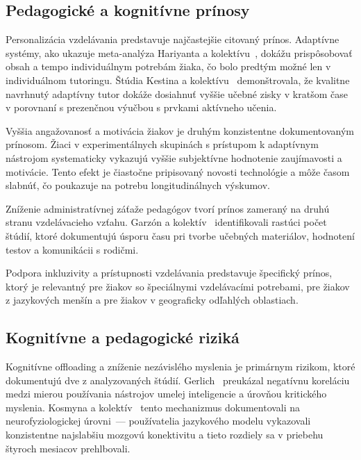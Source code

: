 \subsection{Pedagogické a kognitívne prínosy}

Personalizácia vzdelávania predstavuje najčastejšie citovaný prínos. Adaptívne systémy, ako ukazuje meta-analýza Hariyanta a kolektívu~\cite{hariyanto2025adaptive}, dokážu prispôsobovať obsah a tempo individuálnym potrebám žiaka, čo bolo predtým možné len v individuálnom tutoringu. Štúdia Kestina a kolektívu~\cite{kestin2025aitutoring} demonštrovala, že kvalitne navrhnutý adaptívny tutor dokáže dosiahnuť vyššie učebné zisky v kratšom čase v porovnaní s prezenčnou výučbou s prvkami aktívneho učenia.

Vyššia angažovanosť a motivácia žiakov je druhým konzistentne dokumentovaným prínosom. Žiaci v experimentálnych skupinách s prístupom k adaptívnym nástrojom systematicky vykazujú vyššie subjektívne hodnotenie zaujímavosti a motivácie. Tento efekt je čiastočne pripisovaný novosti technológie a môže časom slabnúť, čo poukazuje na potrebu longitudinálnych výskumov.

Zníženie administratívnej záťaže pedagógov tvorí prínos zameraný na druhú stranu vzdelávacieho vzťahu. Garzón a kolektív~\cite{garzon2025systematic} identifikovali rastúci počet štúdií, ktoré dokumentujú úsporu času pri tvorbe učebných materiálov, hodnotení testov a komunikácii s rodičmi.

Podpora inkluzivity a prístupnosti vzdelávania predstavuje špecifický prínos, ktorý je relevantný pre žiakov so špeciálnymi vzdelávacími potrebami, pre žiakov z jazykových menšín a pre žiakov v geograficky odľahlých oblastiach.


\subsection{Kognitívne a pedagogické riziká}

Kognitívne offloading a zníženie nezávislého myslenia je primárnym rizikom, ktoré dokumentujú dve z analyzovaných štúdií. Gerlich~\cite{gerlich2025offloading} preukázal negatívnu koreláciu medzi mierou používania nástrojov umelej inteligencie a úrovňou kritického myslenia. Kosmyna a kolektív~\cite{kosmyna2025brain} tento mechanizmus dokumentovali na neurofyziologickej úrovni~--- používatelia jazykového modelu vykazovali konzistentne najslabšiu mozgovú konektivitu a tieto rozdiely sa v priebehu štyroch mesiacov prehlbovali.

